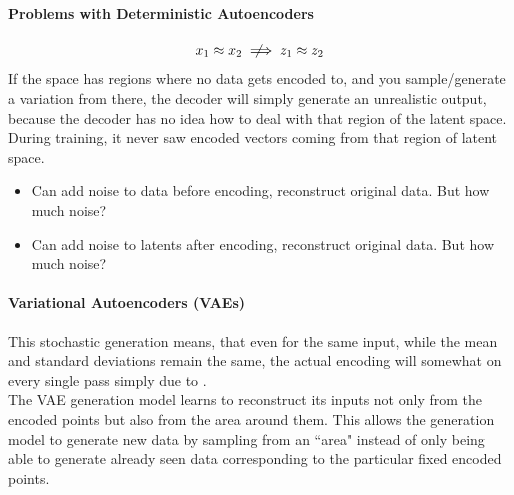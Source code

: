 \documentclass[11pt]{article}
\begin{document}
\paragraph{Problems with Deterministic Autoencoders}
$$x_1 \approx x_2 \notimplies z_1 \approx z_2$$
If the space has regions where no data gets encoded to, and you sample/generate a variation from there, the decoder will simply generate an unrealistic output, because the decoder has no idea how to deal with that region of the latent space. During training, it never saw encoded vectors coming from that region of latent space.\\
\begin{itemize}
	\item Can add noise to data before encoding, reconstruct original data. But how much noise? 
	\item Can add noise to latents after encoding, reconstruct original data. But how much noise?
\end{itemize}

\paragraph{Variational Autoencoders (VAEs)}
This stochastic generation means, that even for the same input, while the mean and standard deviations remain the same, the actual encoding will somewhat  on every single pass simply due to . \\
The VAE generation model learns to reconstruct its inputs not only from the encoded points but also from the area around them. This allows the generation model to generate new data by sampling from an ``area" instead of only being able to generate already seen data corresponding to the particular fixed encoded points.
\end{document}
